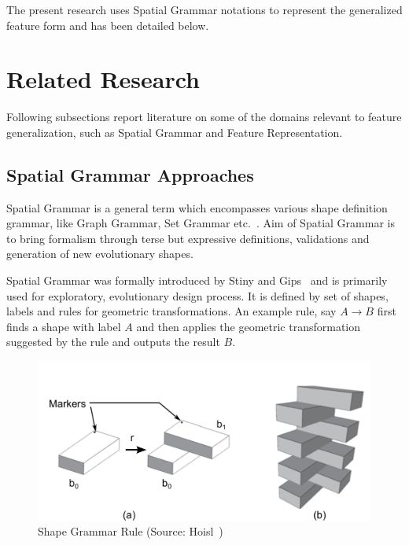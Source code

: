 The present research uses Spatial Grammar notations to represent the generalized feature form and has been detailed below. 

\section{Related Research}

Following subsections report literature on some of the domains relevant to feature generalization, such as Spatial Grammar and Feature Representation.
%

\subsection{Spatial Grammar Approaches}


Spatial Grammar is a general term which encompasses various shape definition grammar, like Graph Grammar, Set Grammar etc.~\cite{mckay2012}. Aim of Spatial Grammar is to bring formalism through terse but expressive definitions, validations and generation of new evolutionary shapes. 

Spatial Grammar was formally introduced by Stiny and Gips~\cite{Stiny1971} and is primarily used for exploratory, evolutionary design process. It is defined by set of shapes, labels and rules for geometric transformations. An example rule, say $A \rightarrow B$ first finds a shape with label $A$ and then applies the geometric transformation suggested by the rule and outputs the result $B$. 



	\begin{figure}[!h]
	\centering
	\includegraphics[width=0.62\linewidth]{images/stinyrules.pdf}
	\caption{Shape Grammar Rule (Source: Hoisl~\cite{Hoisl2009})}
	\label{fig:able:StinyRules}
	\end{figure}


